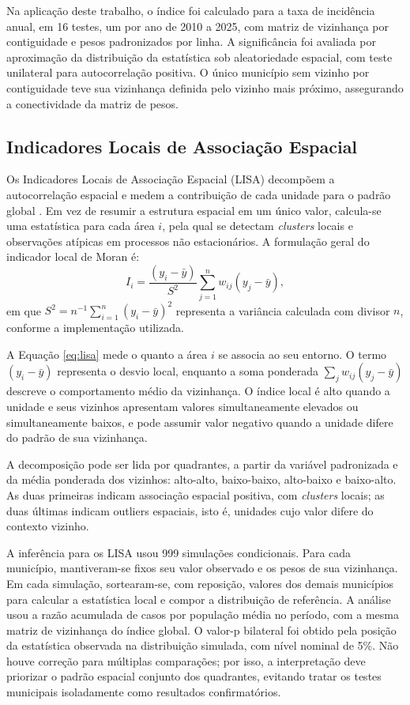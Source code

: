 Na aplicação deste trabalho, o índice foi calculado para a taxa de incidência anual, em 16 testes, um por ano de 2010 a 2025, com matriz de vizinhança por contiguidade e pesos padronizados por linha. A significância foi avaliada por aproximação da distribuição da estatística sob aleatoriedade espacial, com teste unilateral para autocorrelação positiva. O único município sem vizinho por contiguidade teve sua vizinhança definida pelo vizinho mais próximo, assegurando a conectividade da matriz de pesos.

\subsection{Indicadores Locais de Associação Espacial}

Os Indicadores Locais de Associação Espacial (LISA) decompõem a autocorrelação espacial e medem a contribuição de cada unidade para o padrão global \cite{anselin1995}. Em vez de resumir a estrutura espacial em um único valor, calcula-se uma estatística para cada área \(i\), pela qual se detectam \textit{clusters} locais e observações atípicas em processos não estacionários. A formulação geral do indicador local de Moran é:
\begin{equation}
I_i
=
\frac{(y_i-\bar{y})}{S^2}
\sum_{j=1}^{n}w_{ij}(y_j-\bar{y}),
\label{eq:lisa}
\end{equation}
em que $S^2 = n^{-1}\sum_{i=1}^{n}(y_i-\bar{y})^2$ representa a variância calculada com divisor $n$, conforme a implementação utilizada.

A Equação \eqref{eq:lisa} mede o quanto a área \(i\) se associa ao seu entorno. O termo \((y_i-\bar{y})\) representa o desvio local, enquanto a soma ponderada \(\sum_j w_{ij}(y_j-\bar{y})\) descreve o comportamento médio da vizinhança. O índice local é alto quando a unidade e seus vizinhos apresentam valores simultaneamente elevados ou simultaneamente baixos, e pode assumir valor negativo quando a unidade difere do padrão de sua vizinhança.

A decomposição pode ser lida por quadrantes, a partir da variável padronizada e da média ponderada dos vizinhos: alto-alto, baixo-baixo, alto-baixo e baixo-alto. As duas primeiras indicam associação espacial positiva, com \textit{clusters} locais; as duas últimas indicam outliers espaciais, isto é, unidades cujo valor difere do contexto vizinho.

A inferência para os LISA usou 999 simulações condicionais. Para cada município, mantiveram-se fixos seu valor observado e os pesos de sua vizinhança. Em cada simulação, sortearam-se, com reposição, valores dos demais municípios para calcular a estatística local e compor a distribuição de referência. A análise usou a razão acumulada de casos por população média no período, com a mesma matriz de vizinhança do índice global. O valor-p bilateral foi obtido pela posição da estatística observada na distribuição simulada, com nível nominal de 5\%. Não houve correção para múltiplas comparações; por isso, a interpretação deve priorizar o padrão espacial conjunto dos quadrantes, evitando tratar os testes municipais isoladamente como resultados confirmatórios.

